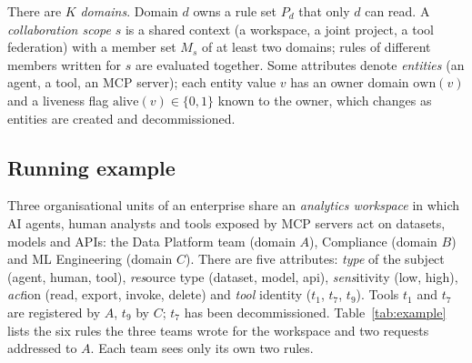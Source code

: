 \documentclass[preprint,12pt]{elsarticle}
\theoremstyle{definition}
\begin{document}
There are $K$ \emph{domains}. Domain $d$ owns a rule set $P_d$ that only $d$ can read. A \emph{collaboration scope} $s$ is a shared context (a workspace, a joint project, a tool federation) with a member set $M_s$ of at least two domains; rules of different members written for $s$ are evaluated together. Some attributes denote \emph{entities} (an agent, a tool, an MCP server); each entity value $v$ has an owner domain $\mathrm{own}(v)$ and a liveness flag $\mathrm{alive}(v)\in\{0,1\}$ known to the owner, which changes as entities are created and decommissioned.

\subsection{Running example}
\label{sec:example}
Three organisational units of an enterprise share an \emph{analytics workspace} in which AI agents, human analysts and tools exposed by MCP servers act on datasets, models and APIs: the Data Platform team (domain $A$), Compliance (domain $B$) and ML Engineering (domain $C$). There are five attributes: \textit{type} of the subject (agent, human, tool), \textit{res}ource type (dataset, model, api), \textit{sens}itivity (low, high), \textit{act}ion (read, export, invoke, delete) and \textit{tool} identity ($t_1$, $t_7$, $t_9$). Tools $t_1$ and $t_7$ are registered by $A$, $t_9$ by $C$; $t_7$ has been decommissioned. Table~\ref{tab:example} lists the six rules the three teams wrote for the workspace and two requests addressed to $A$. Each team sees only its own two rules.
\end{document}
